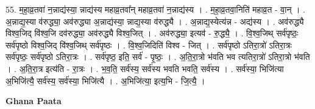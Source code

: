 \documentclass[17pt]{extarticle}
\begin{document}
55. म॒हा॒व्र॒तवा॑ न॒न्नाद्य॑स्या॒ न्नाद्य॑स्य महाव्र॒तवा᳚न् महाव्र॒तवा॑ न॒न्नाद्य॑स्य । . म॒हा॒व्र॒तवा॒निति॑ महाव्र॒त - वा॒न् । . अ॒न्नाद्य॒स्या व॑रुद्ध्या॒ अव॑रुद्ध्या अ॒न्नाद्य॑स्या॒ न्नाद्य॒स्या व॑रुद्ध्यै । . अ॒न्नाद्य॒स्येत्य॑न्न - अद्य॑स्य । . अव॑रुद्ध्यै विश्व॒जिद् वि॑श्व॒जि दव॑रुद्ध्या॒ अव॑रुद्ध्यै विश्व॒जित् । . अव॑रुद्ध्या॒ इत्यव॑ - रु॒द्ध्यै॒ । . वि॒श्व॒जिथ् सर्व॑पृष्ठः॒ सर्व॑पृष्ठो विश्व॒जिद् वि॑श्व॒जिथ् सर्व॑पृष्ठः । . वि॒श्व॒जिदिति॑ विश्व - जित् । . सर्व॑पृष्ठो ऽतिरा॒त्रो॑ ऽतिरा॒त्रः सर्व॑पृष्ठः॒ सर्व॑पृष्ठो ऽतिरा॒त्रः । . सर्व॑पृष्ठ॒ इति॒ सर्व॑ - पृ॒ष्ठः॒ । . अ॒ति॒रा॒त्रो भ॑वति भव त्यतिरा॒त्रो॑ ऽतिरा॒त्रो भ॑वति । . अ॒ति॒रा॒त्र इत्य॑ति - रा॒त्रः । . भ॒व॒ति॒ सर्व॑स्य॒ सर्व॑स्य भवति भवति॒ सर्व॑स्य । . सर्व॑स्या॒ भिजि॑त्या अ॒भिजि॑त्यै॒ सर्व॑स्य॒ सर्व॑स्या॒ भिजि॑त्यै । . अ॒भिजि॑त्या॒ इत्य॒भि - जि॒त्यै॒ । \newline

\textbf{Ghana Paata } \newline
\end{document}
